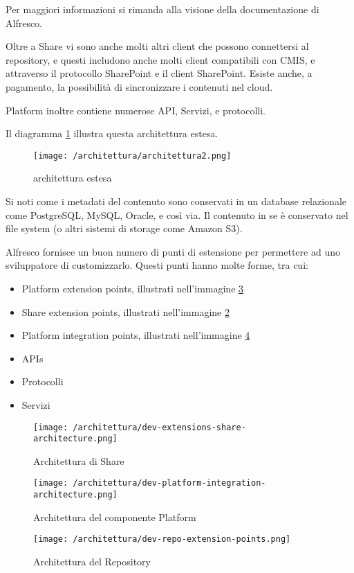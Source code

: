 Per maggiori informazioni si rimanda alla visione della documentazione di Alfresco.

Oltre a Share vi sono anche molti altri client che possono connettersi al repository, e questi includono anche molti client compatibili con CMIS, e attraverso il protocollo SharePoint e il client SharePoint. Esiste anche, a pagamento, la possibilità di sincronizzare i contenuti nel cloud.

Platform inoltre contiene numerose \gls{API}, Servizi, e protocolli.

Il diagramma \ref{fig:architettura-estesa} illustra questa architettura estesa.

\begin{figure}[!ht]
\centering
\texttt{[image: /architettura/architettura2.png]}
\caption{architettura estesa\label{fig:architettura-estesa}}
\end{figure}

Si noti come i metadati del contenuto sono conservati in un database relazionale come PostgreSQL, MySQL, Oracle, e così via. Il contenuto in se è conservato nel file system (o altri sistemi di storage come Amazon S3).

Alfresco fornisce un buon numero di punti di estensione per permettere ad uno sviluppatore di customizzarlo. Questi punti hanno molte forme, tra cui:
\begin{itemize}
\item Platform extension points, illustrati nell'immagine \ref{fig:dev-platform-integration-architecture.png}
\item Share extension points, illustrati nell'immagine \ref{fig:dev-extensions-share-architecture}
\item Platform integration points, illustrati nell'immagine \ref{fig:dev-repo-extension-points.png}
\item \gls{API}s
\item Protocolli
\item Servizi
\end{itemize}
\begin{figure}[!ht]
\centering
\texttt{[image: /architettura/dev-extensions-share-architecture.png]}
\caption{Architettura di Share\label{fig:dev-extensions-share-architecture}}
\end{figure}
\begin{figure}[!ht]
\centering
\texttt{[image: /architettura/dev-platform-integration-architecture.png]}
\caption{Architettura del componente Platform\label{fig:dev-platform-integration-architecture.png}}
\end{figure}
\begin{figure}[!ht]
\centering
\texttt{[image: /architettura/dev-repo-extension-points.png]}
\caption{Architettura del Repository\label{fig:dev-repo-extension-points.png}}
\end{figure}
